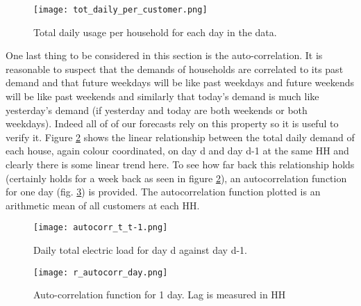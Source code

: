 \begin{figure}
\centering
\texttt{[image: tot\_daily\_per\_customer.png]}
\caption{Total daily usage per household for each day in the data.}
\label{fig:totes}
\end{figure}

One last thing to be considered in this section is the auto-correlation. It is reasonable to suspect that the demands of households are correlated to its past demand and that future weekdays will be like past weekdays and future weekends will be like past weekends and similarly that today's demand is much like yesterday's demand (if yesterday and today are both weekends or both weekdays). Indeed all of of our forecasts rely on this property so it is useful to verify it.  Figure \ref{fig:ty_colour} shows the linear relationship between the total daily demand of each house, again colour coordinated, on day d and day d-1 at the same HH and clearly there is some linear trend here. To see how far back this relationship holds (certainly holds for a week back as seen in figure \ref{fig:ty_colour}), an autocorrelation function for one day (fig. \ref{fig:acf_day}) is provided. The autocorrelation function plotted is an arithmetic mean of all customers at each HH.

\begin{figure}
\centering
\texttt{[image: autocorr\_t\_t-1.png]}
\caption{Daily total electric load for day d against day d-1.}
\label{fig:ty_colour} 
\end{figure}

\begin{figure}
\centering
\texttt{[image: r\_autocorr\_day.png]}
\caption{Auto-correlation function for 1 day. Lag is measured in HH}
\label{fig:acf_day} 
\end{figure}


